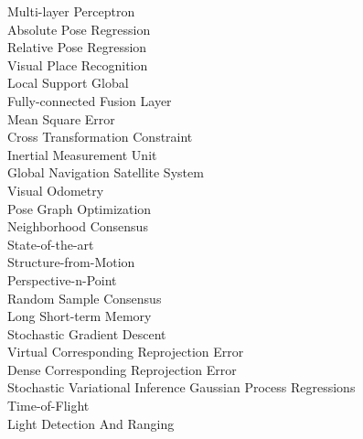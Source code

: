 \begin{arc}
			{Multi-layer Perceptron } 		\\
			{Absolute Pose Regression} 		\\
			{Relative Pose Regression} 		\\
			{Visual Place Recognition} \\
			{Local Support Global} \\
			{Fully-connected Fusion Layer} \\
			{Mean Square Error} \\
			{Cross Transformation Constraint} \\
			{Inertial Measurement Unit} \\
			{Global Navigation Satellite System} \\
			{Visual Odometry} \\
			{Pose Graph Optimization} \\
			{Neighborhood Consensus} \\
			{State-of-the-art} \\
			{Structure-from-Motion} \\
			{Perspective-n-Point} \\
		{Random Sample Consensus} \\
			{Long Short-term Memory} \\
			{Stochastic Gradient Descent} \\
			{Virtual Corresponding Reprojection Error} \\
			{Dense Corresponding Reprojection Error} \\
	 	{Stochastic Variational Inference Gaussian Process Regressions} \\
			{Time-of-Flight} 						\\
			{Light Detection And Ranging}
\end{arc}


